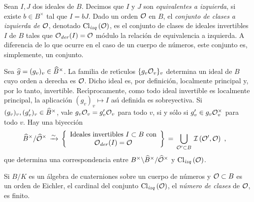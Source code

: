 Sean $I,J$ dos ideales de $B$. Decimos que $I$ y $J$ son \emph{equivalentes a %
izquierda}, si existe $b\in B^{\times}$ tal que $I=bJ$. Dado un orden $\cal{O}$
en $B$, el \emph{conjunto de clases a izquierda de $\cal{O}$}, denotado
$\lClass{\cal{O}}$, es el conjunto de clases de ideales invertibles $I$ de $B$
tales que $\Oder(I)=\cal{O}$ m\'{o}dulo la relaci\'{o}n de equivalencia a
izquierda. A diferencia de lo que ocurre en el caso de un cuerpo de
n\'{u}meros, este conjunto es, simplemente, un conjunto.

Sea $\hhat{g}=(g_{v})_{v}\in\Idfin{B}$. La familia de ret\'{\i}culos
$\{g_{v}\cal{O}_{v}\}_{v}$ determina un ideal de $B$ cuyo orden a derecha es
$\cal{O}$. Dicho ideal es, por definici\'{o}n, localmente principal y, por lo
tanto, invertible. Rec\'{\i}procamente, como todo ideal invertible es
localmente principal, la aplicaci\'{o}n $(g_{v})_{v}\mapsto I$ as\'{\i}
definida es sobreyectiva. Si $(g_{v})_{v},(g'_{v})_{v}\in\Idfin{B}$, vale
$g_{v}\cal{O}_{v}=g'_{v}\cal{O}_{v}$ para todo $v$, si y s\'{o}lo si
$g'_{v}\in g_{v}\cal{O}_{v}^{\times}$ para todo $v$. Hay una biyecci\'{o}n
\begin{align*}
	\Idfin{B}/\Idfin{\cal{O}} & \,\xrightarrow{\sim}\,
		\bigg\{\begin{array}{c}
			\text{Ideales invertibles }I\subset B\text{ con} \\
			\Oder(I)=\cal{O}
		\end{array}\bigg\} \,=\,
			\bigcup_{\cal{O}'\subset B}\,\ideales{\cal{O}',\cal{O}}
	\text{ ,}
\end{align*}
%
que determina una correspondencia entre
$B^{\times}\backslash\Idfin{B}/\Idfin{\cal{O}}$ y $\lClass{\cal{O}}$.
%

\begin{teoFinClassNum}\label{thm:numerodeclasesfinito}
	Si $B/K$ es un \'{a}lgebra de cuaterniones sobre un cuerpo de
	n\'{u}meros y $\cal{O}\subset B$ es un orden de Eichler, el cardinal
	del conjunto $\lClass{\cal{O}}$, el \emph{n\'{u}mero de clases} de
	$\cal{O}$, es finito.
\end{teoFinClassNum}


